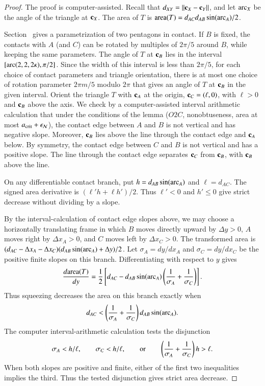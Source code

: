 \begin{proof}
  The proof is computer-assisted.
   Recall that $\dx{XY} = \dd{X}{Y}$, and let
  $\operatorname{arc}_X$ be the angle of the triangle at ${\mathbf c}_X$.  The area of $T$ is
   ${\operatorname{area}}(T) = d_{AC} d_{AB} \sin(\operatorname{arc}_A)/2$.

   Section~ gives a parametrization of two pentagons in contact.
   If $B$ is fixed, the contacts with $A$ (and $C$) can be rotated by multiples
   of $2\pi/5$ around $B$, while keeping the same parameters.
   The angle of $T$ at ${\mathbf c}_B$ lies in the interval
   \([\operatorname{arc}(2,2,2\kappa),\pi/2]\).  Since the width of this interval is less
   than $2\pi/5$, for each choice of contact parameters and triangle orientation, there is at most one choice
   of rotation parameter $2\pi m/5$ modulo $2\pi$ that gives an angle of $T$ at ${\mathbf c}_B$
   in the given interval.
   Orient the triangle $T$ with ${\mathbf c}_A$ at the origin, ${\mathbf c}_C=(\ell,0)$, with $\ell>0$ and
   ${\mathbf c}_B$ above the axis.
   We check by a computer-assisted interval arithmetic calculation that under the conditions of the
   lemma ($O2C$, nonobtuseness, area at most $a_\text{crit}+\epsilon_{\mathcal N}$), the contact edge
   between $A$ and $B$ is not vertical and has negative slope.
   Moreover, ${\mathbf c}_B$ lies above the line through the contact edge and ${\mathbf c}_A$ below.
   By symmetry, the contact edge between $C$ and $B$ is not vertical and has a positive slope.
   The line through the contact edge separates ${\mathbf c}_C$ from ${\mathbf c}_B$, with ${\mathbf c}_B$ above the line.
   
  On any differentiable contact branch, put $h=d_{AB}\sin(\operatorname{arc}_A)$
  and $\ell=d_{AC}$.  The signed area derivative is
  $(\ell'h+\ell h')/2$.  Thus $\ell'<0$ and $h'\le0$
  give strict decrease without dividing by a slope.

  By the interval-calculation of contact edge slopes above, we may
  choose a horizontally translating
  frame in which $B$ moves directly upward by $\Delta y>0$,
  $A$ moves right by $\Delta x_A>0$, and $C$ moves left by
  $\Delta x_C>0$.  The transformed area is
  $(d_{AC}-\Delta x_A - \Delta x_C)
  (d_{AB}\sin(\operatorname{arc}_A)+\Delta y)/2$.
  Let $\sigma_A=dy/dx_A$ and $\sigma_C=dy/dx_C$ be the
  positive finite slopes on this branch.  Differentiating with
  respect to $y$ gives
\[
\frac{d{\operatorname{area}}(T)}{dy}
=\frac12\left[d_{AC}-d_{AB}\sin(\operatorname{arc}_A)
 \left(\frac1{\sigma_A}+\frac1{\sigma_C}\right)\right].
\]
  Thus squeezing decreases the area on this branch exactly when
\[
d_{AC} < \left(\frac{1}{\sigma_A}
+\frac{1}{\sigma_C}\right)d_{AB}\sin(\operatorname{arc}_A).
\]
The computer
interval-arithmetic calculation
tests the disjunction
\[
\sigma_A<h/\ell,\qquad \sigma_C<h/\ell,\qquad\hbox{or}\qquad
\left(\frac1{\sigma_A}+\frac1{\sigma_C}\right)h>\ell.
\]
When both slopes are positive and finite, either of the first two
inequalities implies the third. Thus the tested disjunction gives
strict area decrease.


\end{proof}
